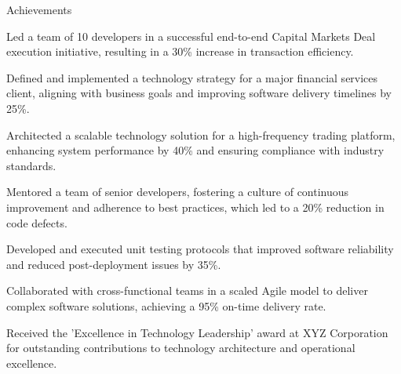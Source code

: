 \documentclass{resume} %
\begin{document}
    \begin{rSection}{Achievements}
        \begin{rSubsection}{}{}{}
                            \item Led a team of 10 developers in a successful end{-}to{-}end Capital Markets Deal execution initiative, resulting in a 30\% increase in transaction efficiency.
                            \item Defined and implemented a technology strategy for a major financial services client, aligning with business goals and improving software delivery timelines by 25\%.
                            \item Architected a scalable technology solution for a high{-}frequency trading platform, enhancing system performance by 40\% and ensuring compliance with industry standards.
                            \item Mentored a team of senior developers, fostering a culture of continuous improvement and adherence to best practices, which led to a 20\% reduction in code defects.
                            \item Developed and executed unit testing protocols that improved software reliability and reduced post{-}deployment issues by 35\%.
                            \item Collaborated with cross{-}functional teams in a scaled Agile model to deliver complex software solutions, achieving a 95\% on{-}time delivery rate.
                            \item Received the 'Excellence in Technology Leadership' award at XYZ Corporation for outstanding contributions to technology architecture and operational excellence.
                    \end{rSubsection}
    \end{rSection}
\end{document}
